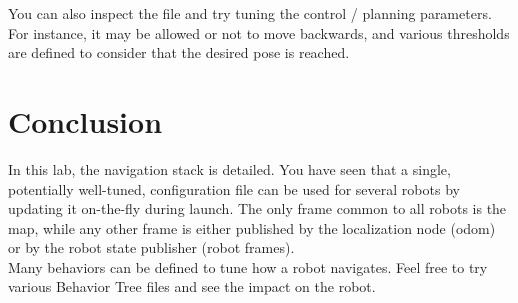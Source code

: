 \documentclass{ecnreport}
\begin{document}
You can also inspect the  file and try tuning the control / planning parameters. For instance, it may be allowed or not to move backwards, and various thresholds are defined to consider that the desired pose is reached.


\section{Conclusion}

In this lab, the navigation stack is detailed. You have seen that a single, potentially well-tuned, configuration file can be used for several robots by updating it on-the-fly during launch. The only frame common to all robots is the map, while any other frame is either published by the localization node (odom) or by the robot state publisher (robot frames). \\

Many behaviors can be defined to tune how a robot navigates. Feel free to try various Behavior Tree files and see the impact on the robot.
\end{document}
